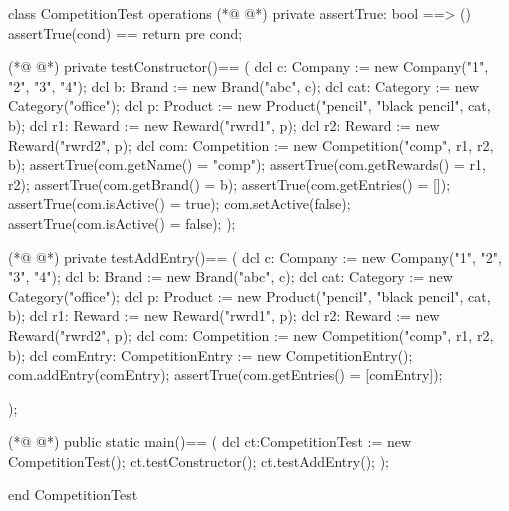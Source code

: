 \begin{vdmpp}[breaklines=true]
class CompetitionTest
 operations
(*@
\label{assertTrue:3}
@*)
  private assertTrue: bool ==> ()
    assertTrue(cond) == return
    pre cond;
    
(*@
\label{testConstructor:7}
@*)
  private testConstructor()==
  (
   dcl c: Company := new Company("1", "2", "3", "4");
   dcl b: Brand := new Brand("abc", c);
   dcl cat: Category := new Category("office");
    dcl p: Product := new Product("pencil", "black pencil", cat, b);
   dcl r1: Reward := new Reward("rwrd1", p);
   dcl r2: Reward := new Reward("rwrd2", p);
   dcl com: Competition := new Competition("comp", {r1, r2}, b);
   assertTrue(com.getName() = "comp");
   assertTrue(com.getRewards() = {r1, r2}); 
   assertTrue(com.getBrand() = b);
   assertTrue(com.getEntries() = []);
   assertTrue(com.isActive() = true);
   com.setActive(false);
   assertTrue(com.isActive() = false);
  );
  
(*@
\label{testAddEntry:25}
@*)
  private testAddEntry()==
   (
   dcl c: Company := new Company("1", "2", "3", "4");
   dcl b: Brand := new Brand("abc", c);
   dcl cat: Category := new Category("office");
    dcl p: Product := new Product("pencil", "black pencil", cat, b);
   dcl r1: Reward := new Reward("rwrd1", p);
   dcl r2: Reward := new Reward("rwrd2", p);
   dcl com: Competition := new Competition("comp", {r1, r2}, b);
   dcl comEntry: CompetitionEntry := new CompetitionEntry();
   com.addEntry(comEntry);
   assertTrue(com.getEntries() = [comEntry]);
      
  );
  
(*@
\label{main:40}
@*)
  public static main()==
    (
   dcl ct:CompetitionTest := new CompetitionTest();
   ct.testConstructor();
   ct.testAddEntry();
    );
     
end CompetitionTest
\end{vdmpp}

